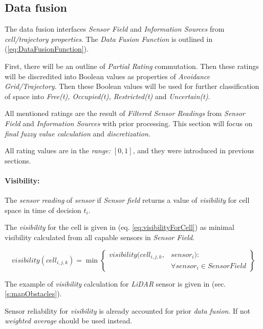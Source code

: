 \subsection{Data fusion}\label{s:sensorFusion}

\noindent The data fusion interfaces \emph{Sensor Field} and \emph{Information Sources} from \emph{cell/trajectory properties}. The \emph{Data Fusion Function} is outlined in (\ref{eq:DataFusionFunction}). 

First, there will be an outline of \emph{Partial Rating} commutation. Then these ratings will be discredited into Boolean values as properties of \emph{Avoidance Grid/Trajectory}. Then these Boolean values will be used for further classification of  space into \emph{Free(t), Occupied(t), Restricted(t)} and \emph{Uncertain(t)}.

All mentioned ratings are the result of \emph{Filtered Sensor Readings} from \emph{Sensor Field} and \emph{Information Sources} with prior processing. This section will focus on \emph{final fuzzy value calculation} and \emph{discretization}. 
\begin{note}
    All rating values are in the \emph{range:} $[0,1]$, and they were introduced in previous sections.
\end{note}


\paragraph{Visibility:} The \emph{sensor reading} of \emph{sensor} if \emph{Sensor field} returns a value of \emph{visibility} for cell space in time of decision $t_i$.

The \emph{visibility} for the cell is given in (eq. \ref{eq:visibilityForCell}) as minimal visibility calculated from all capable sensors in \emph{Sensor Field}.

\begin{equation}\label{eq:visibilityForCell}
    visibility(cell_{i,j,k}) = \min \left\{\begin{aligned}visibility(cell_{i,j,k},&sensor_i):\\&\forall sensor_i \in Sensor Field\end{aligned}\right\}
\end{equation}

\noindent The example of \emph{visibility} calculation for \emph{LiDAR} sensor is given in (sec. \ref{s:mapObstacles}).

\begin{note}
    Sensor reliability for \emph{visibility} is already accounted for prior \emph{data fusion}. If not \emph{weighted average} should be used instead. 
\end{note}


